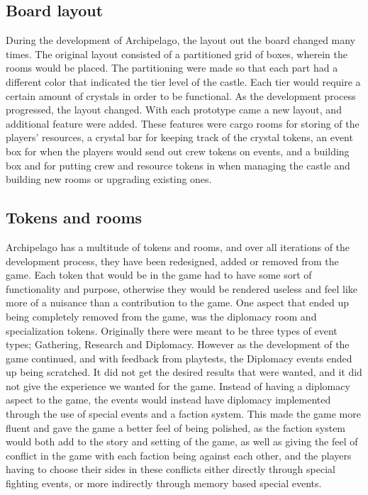 \subsection{Board layout}
During the development of Archipelago, the layout out the board changed many times. The original layout consisted of a partitioned grid of boxes, wherein the rooms would be placed. The partitioning were made so that each part had a different color that indicated the tier level of the castle. Each tier would require a certain amount of crystals in order to be functional. 
As the development process progressed, the layout changed. With each prototype came a new layout, and additional feature were added. These features were cargo rooms for storing of the players' resources, a crystal bar for keeping track of the crystal tokens, an event box for when the players would send out crew tokens on events, and a building box and for putting crew and resource tokens in when managing the castle and building new rooms or upgrading existing ones. 
\subsection{Tokens and rooms}
Archipelago has a multitude of tokens and rooms, and over all iterations of the development process, they have been redesigned, added or removed from the game. Each token that would be in the game had to have some sort of functionality and purpose, otherwise they would be rendered useless and feel like more of a nuisance than a contribution to the game. One aspect that ended up being completely removed from the game, was the diplomacy room and specialization tokens. Originally there were meant to be three types of event types; Gathering, Research and Diplomacy. However as the development of the game continued, and with feedback from playtests, the Diplomacy events ended up being scratched. It did not get the desired results that were wanted, and it did not give the experience we wanted for the game. Instead of having a diplomacy aspect to the game, the events would instead have diplomacy implemented through the use of special events and a faction system. This made the game more fluent and gave the game a better feel of being polished, as the faction system would both add to the story and setting of the game, as well as giving the feel of conflict in the game with each faction being against each other, and the players having to choose their sides in these conflicts either directly through special fighting events, or more indirectly through memory based special events.

